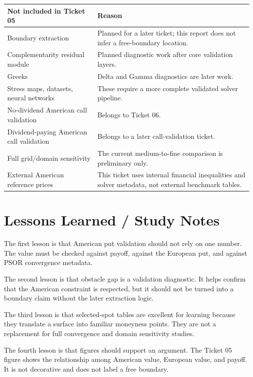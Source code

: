 \documentclass[11pt,a4paper]{article}
\begin{document}
\begin{longtable}{L{0.34\textwidth}L{0.54\textwidth}}
\toprule
Not included in Ticket 05 & Reason \\
\midrule
\endhead
Boundary extraction & Planned for a later ticket; this report does not infer a free-boundary
location. \\
Complementarity residual module & Planned diagnostic work after core validation layers. \\
Greeks & Delta and Gamma diagnostics are later work. \\
Stress maps, datasets, neural networks & These require a more complete validated solver pipeline. \\
No-dividend American call validation & Belongs to Ticket 06. \\
Dividend-paying American call validation & Belongs to a later call-validation ticket. \\
Full grid/domain sensitivity & The current medium-to-fine comparison is preliminary only. \\
External American reference prices & This ticket uses internal financial inequalities and solver metadata, not external benchmark
tables. \\
\bottomrule
\end{longtable}

\section{Lessons Learned / Study Notes}

The first lesson is that American put validation should not rely on one number. The value must be
checked against payoff, against the European put, and against PSOR convergence metadata.

The second lesson is that obstacle gap is a validation diagnostic. It helps confirm that the
American constraint is respected, but it should not be turned into a boundary claim without the
later extraction logic.

The third lesson is that selected-spot tables are excellent for learning because they translate a
surface into familiar moneyness points. They are not a replacement for full convergence and domain
sensitivity studies.

The fourth lesson is that figures should support an argument. The Ticket 05 figure shows the
relationship among American value, European value, and payoff. It is not decorative and does not
label a free boundary.
\end{document}

